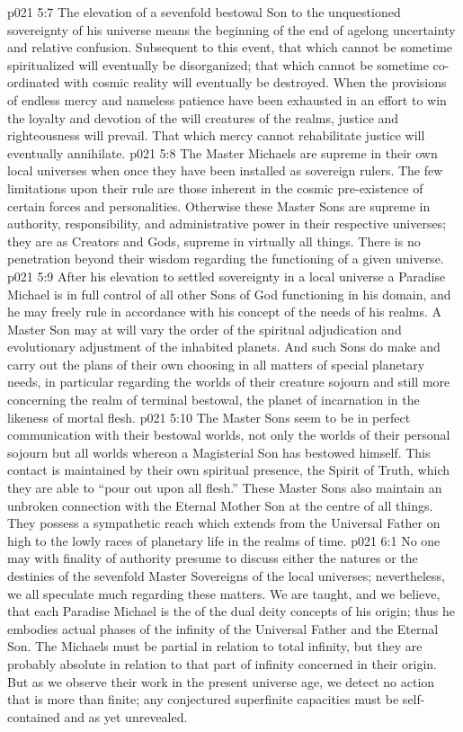 \vs p021 5:7 The elevation of a sevenfold bestowal Son to the unquestioned sovereignty of his universe means the beginning of the end of agelong uncertainty and relative confusion. Subsequent to this event, that which cannot be sometime spiritualized will eventually be disorganized; that which cannot be sometime co\hyp{}ordinated with cosmic reality will eventually be destroyed. When the provisions of endless mercy and nameless patience have been exhausted in an effort to win the loyalty and devotion of the will creatures of the realms, justice and righteousness will prevail. That which mercy cannot rehabilitate justice will eventually annihilate.
\vs p021 5:8 \pc The Master Michaels are supreme in their own local universes when once they have been installed as sovereign rulers. The few limitations upon their rule are those inherent in the cosmic pre\hyp{}existence of certain forces and personalities. Otherwise these Master Sons are supreme in authority, responsibility, and administrative power in their respective universes; they are as Creators and Gods, supreme in virtually all things. There is no penetration beyond their wisdom regarding the functioning of a given universe.
\vs p021 5:9 After his elevation to settled sovereignty in a local universe a Paradise Michael is in full control of all other Sons of God functioning in his domain, and he may freely rule in accordance with his concept of the needs of his realms. A Master Son may at will vary the order of the spiritual adjudication and evolutionary adjustment of the inhabited planets. And such Sons do make and carry out the plans of their own choosing in all matters of special planetary needs, in particular regarding the worlds of their creature sojourn and still more concerning the realm of terminal bestowal, the planet of incarnation in the likeness of mortal flesh.
\vs p021 5:10 The Master Sons seem to be in perfect communication with their bestowal worlds, not only the worlds of their personal sojourn but all worlds whereon a Magisterial Son has bestowed himself. This contact is maintained by their own spiritual presence, the Spirit of Truth, which they are able to “pour out upon all flesh.” These Master Sons also maintain an unbroken connection with the Eternal Mother Son at the centre of all things. They possess a sympathetic reach which extends from the Universal Father on high to the lowly races of planetary life in the realms of time.
\vs p021 6:1 No one may with finality of authority presume to discuss either the natures or the destinies of the sevenfold Master Sovereigns of the local universes; nevertheless, we all speculate much regarding these matters. We are taught, and we believe, that each Paradise Michael is the  of the dual deity concepts of his origin; thus he embodies actual phases of the infinity of the Universal Father and the Eternal Son. The Michaels must be partial in relation to total infinity, but they are probably absolute in relation to that part of infinity concerned in their origin. But as we observe their work in the present universe age, we detect no action that is more than finite; any conjectured superfinite capacities must be self\hyp{}contained and as yet unrevealed.
